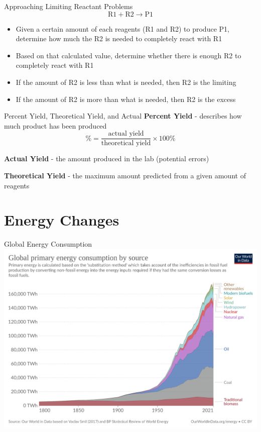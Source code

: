 \documentclass[11pt]{beamer}
\begin{document}
\begin{frame}{Approaching Limiting Reactant Problems}
  \begin{equation}
    \text{R1} + \text{R2} \rightarrow \text{P1}
  \end{equation}
  \begin{itemize}
  \item Given a certain amount of each reagents (R1 and R2)
    to produce P1, determine
    how much the R2 is needed to completely react with R1
  \item Based on that calculated value, determine whether
    there is enough R2 to completely react with R1
  \item If the amount of R2 is less than what is needed,
    then R2 is the limiting
  \item If the amount of R2 is more than what is needed,
    then R2 is the excess
  \end{itemize}
\end{frame}

\begin{frame}{Percent Yield, Theoretical Yield, and Actual}
  \textbf{Percent Yield} - describes how much product has been
  produced
  \begin{equation}
    \% = \frac{\text{actual yield}}{\text{theoretical yield}} \times 100\%
  \end{equation}
 
  \textbf{Actual Yield} - the amount produced in the lab (potential errors)

  \textbf{Theoretical Yield} - the maximum amount predicted from a given amount
  of reagents
\end{frame}

\section{Energy Changes}

\begin{frame}{Global Energy Consumption}
  \centering
  \includegraphics[width=\linewidth]{global_energy}
\end{frame}
\end{document}
